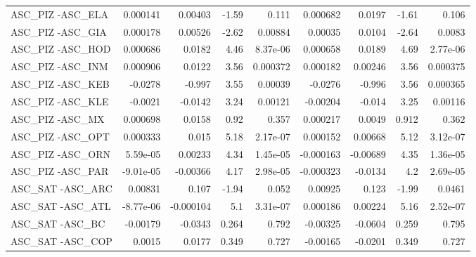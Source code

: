 \begin{tabular}{lrrrrrrrr}
ASC\_PIZ -ASC\_ELA                       &    0.000141 &      0.00403 &   -1.59 &    0.111 &   0.000682 &      0.0197 &        -1.61 &         0.106 \\
ASC\_PIZ -ASC\_GIA                       &    0.000178 &      0.00526 &   -2.62 &  0.00884 &    0.00035 &      0.0104 &        -2.64 &        0.0083 \\
ASC\_PIZ -ASC\_HOD                       &    0.000686 &       0.0182 &    4.46 & 8.37e-06 &   0.000658 &      0.0189 &         4.69 &      2.77e-06 \\
ASC\_PIZ -ASC\_INM                       &    0.000906 &       0.0122 &    3.56 & 0.000372 &   0.000182 &     0.00246 &         3.56 &      0.000375 \\
ASC\_PIZ -ASC\_KEB                       &     -0.0278 &       -0.997 &    3.55 &  0.00039 &    -0.0276 &      -0.996 &         3.56 &      0.000365 \\
ASC\_PIZ -ASC\_KLE                       &     -0.0021 &      -0.0142 &    3.24 &  0.00121 &   -0.00204 &      -0.014 &         3.25 &       0.00116 \\
ASC\_PIZ -ASC\_MX                        &    0.000698 &       0.0158 &    0.92 &    0.357 &   0.000217 &      0.0049 &        0.912 &         0.362 \\
ASC\_PIZ -ASC\_OPT                       &    0.000333 &        0.015 &    5.18 & 2.17e-07 &   0.000152 &     0.00668 &         5.12 &      3.12e-07 \\
ASC\_PIZ -ASC\_ORN                       &    5.59e-05 &      0.00233 &    4.34 & 1.45e-05 &  -0.000163 &    -0.00689 &         4.35 &      1.36e-05 \\
ASC\_PIZ -ASC\_PAR                       &   -9.01e-05 &     -0.00366 &    4.17 & 2.98e-05 &  -0.000323 &     -0.0134 &          4.2 &      2.69e-05 \\
ASC\_SAT -ASC\_ARC                       &     0.00831 &        0.107 &   -1.94 &    0.052 &    0.00925 &       0.123 &        -1.99 &        0.0461 \\
ASC\_SAT -ASC\_ATL                       &   -8.77e-06 &    -0.000104 &     5.1 & 3.31e-07 &   0.000186 &     0.00224 &         5.16 &      2.52e-07 \\
ASC\_SAT -ASC\_BC                        &    -0.00179 &      -0.0343 &   0.264 &    0.792 &   -0.00325 &     -0.0604 &        0.259 &         0.795 \\
ASC\_SAT -ASC\_COP                       &      0.0015 &       0.0177 &   0.349 &    0.727 &   -0.00165 &     -0.0201 &        0.349 &         0.727 \\

\end{tabular}
